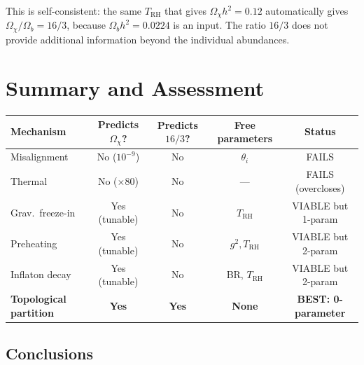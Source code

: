 \documentclass[11pt]{article}
\theoremstyle{definition}
\theoremstyle{remark}
\begin{document}
This is self-consistent: the same $T_\mathrm{RH}$ that gives
$\Omega_\chi h^2 = 0.12$ automatically gives $\Omega_\chi/\Omega_b = 16/3$,
because $\Omega_b h^2 = 0.0224$ is an input. The ratio $16/3$ does not
provide additional information beyond the individual abundances.


\section{Summary and Assessment}
\label{sec:summary}

\begin{center}
\renewcommand{\arraystretch}{1.4}
\begin{tabular}{lcccc}
\toprule
\textbf{Mechanism} & \textbf{Predicts $\Omega_\chi$?} &
\textbf{Predicts $16/3$?} & \textbf{Free parameters} & \textbf{Status} \\
\midrule
Misalignment & No ($10^{-9}$) & No & $\theta_i$ & FAILS \\
Thermal & No ($\times 80$) & No & --- & FAILS (overcloses) \\
Grav.\ freeze-in & Yes (tunable) & No & $T_\mathrm{RH}$ & VIABLE but 1-param \\
Preheating & Yes (tunable) & No & $g^2, T_\mathrm{RH}$ & VIABLE but 2-param \\
Inflaton decay & Yes (tunable) & No & BR, $T_\mathrm{RH}$ & VIABLE but 2-param \\
\textbf{Topological partition} & \textbf{Yes} & \textbf{Yes} &
\textbf{None} & \textbf{BEST: 0-parameter} \\
\bottomrule
\end{tabular}
\end{center}

\subsection{Conclusions}
\end{document}
